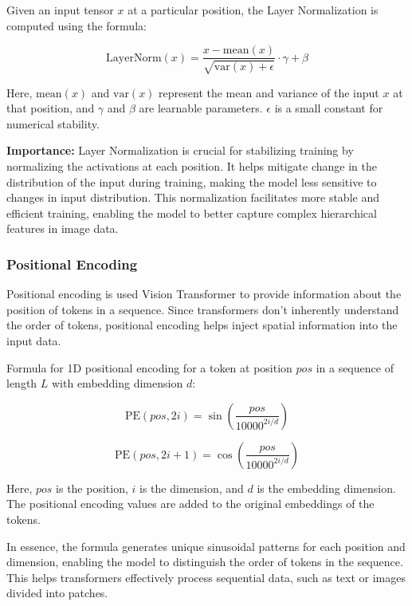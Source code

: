 \noindent Given an input tensor $x$ at a particular position, the Layer Normalization is computed using the formula:

\begin{equation}
    \text{LayerNorm}(x) = \frac{x - \text{mean}(x)}{\sqrt{\text{var}(x) + \epsilon}} \cdot \gamma + \beta \label{eq:layer_norm}
\end{equation}

\noindent Here, $\text{mean}(x)$ and $\text{var}(x)$ represent the mean and variance of the input $x$ at that position, and $\gamma$ and $\beta$ are learnable parameters. $\epsilon$ is a small constant for numerical stability.

\noindent \textbf{Importance:}
Layer Normalization is crucial for stabilizing training by normalizing the activations at each position. It helps mitigate change in the distribution of the input during training, making the model less sensitive to changes in input distribution. This normalization facilitates more stable and efficient training, enabling the model to better capture complex hierarchical features in image data.

\subsubsection{Positional Encoding}
Positional encoding is used Vision Transformer to provide information about the position of tokens in a sequence. Since transformers don't inherently understand the order of tokens, positional encoding helps inject spatial information into the input data.

\noindent Formula for 1D positional encoding for a token at position $pos$ in a sequence of length $L$ with embedding dimension $d$:

\begin{equation}
    \text{PE}(pos, 2i) = \sin\left(\frac{pos}{10000^{2i/d}}\right) \label{eq:pos_encoding_sin}
\end{equation}

\begin{equation}
    \text{PE}(pos, 2i+1) = \cos\left(\frac{pos}{10000^{2i/d}}\right) \label{eq:pos_encoding_cos}
\end{equation}


\noindent Here, $pos$ is the position, $i$ is the dimension, and $d$ is the embedding dimension. The positional encoding values are added to the original embeddings of the tokens.

\noindent In essence, the formula generates unique sinusoidal patterns for each position and dimension, enabling the model to distinguish the order of tokens in the sequence. This helps transformers effectively process sequential data, such as text or images divided into patches.

